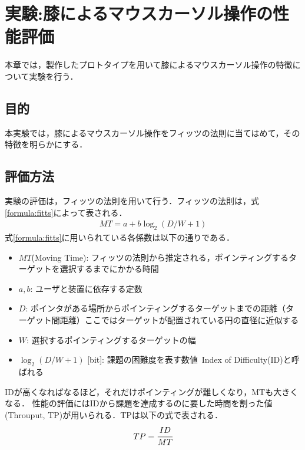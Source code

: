 \chapter{実験:膝によるマウスカーソル操作の性能評価} 
本章では，製作したプロトタイプを用いて膝によるマウスカーソル操作の特徴について実験を行う．
\section{目的}
本実験では，膝によるマウスカーソル操作をフィッツの法則に当てはめて，その特徴を明らかにする．
\section{評価方法}
実験の評価は，フィッツの法則を用いて行う．フィッツの法則は，式\ref{formula:fitts}によって表される．
\begin{eqnarray}
	MT = a + b\log_2{(D/W + 1)}
	\label{formula:fitts}
\end{eqnarray}
式\ref{formula:fitts}に用いられている各係数は以下の通りである．
\begin{itemize}
	\item {$MT$(Moving Time): }フィッツの法則から推定される，ポインティングするターゲットを選択するまでにかかる時間
	\item {$a,b$: }ユーザと装置に依存する定数
	\item {$D$: }ポインタがある場所からポインティングするターゲットまでの距離（ターゲット間距離）ここではターゲットが配置されている円の直径に近似する
	\item {$W$: }選択するポインティングするターゲットの幅
	\item { $\log_2{(D/W + 1)}$ [bit]: } 課題の困難度を表す数値\ Index of Difficulty(ID)と呼ばれる
\end{itemize}
IDが高くなればなるほど，それだけポインティングが難しくなり，MTも大きくなる．
性能の評価にはIDから課題を達成するのに要した時間を割った値(Throuput, TP)が用いられる．TPは以下の式で表される．
\begin{eqnarray}
	TP = \cfrac{ID}{MT}
	\label{formula:fitts}
\end{eqnarray}
